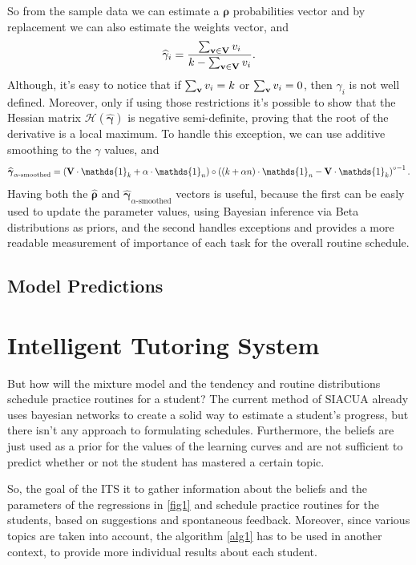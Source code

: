 \documentclass{article}
\newcommand{\0}{\mathbbold{0}}
\newcommand{\1}{\mathds{1}}
\newcommand{\2}{\mathbbold{2}}
\begin{document}
So from the sample data we can estimate a ${\boldsymbol \rho}$ probabilities vector and by replacement we can also estimate the weights vector, and
\begin{equation*}
    \widehat{\gamma}_i = \frac{\sum_{{\bf v}\in{\bf V}}v_i}{k - \sum_{{\bf v}\in{\bf V}}v_i}.
\end{equation*}
Although, it's easy to notice that if $\sum_{{\bf v}}v_i = k$ or $\sum_{{\bf v}}v_i = 0$, then $\gamma_i$ is not well defined. Moreover, only if using those restrictions it's possible to show that the Hessian matrix $\mathcal{H}(\widehat{\boldsymbol \gamma})$ is negative semi-definite, proving that the root of the derivative is a local maximum.
To handle this exception, we can use additive smoothing to the $\gamma$ values, and
\begin{equation*}
    \widehat{\boldsymbol \gamma}_{\alpha\text{-smoothed}} = \left({\bf V}\cdot\1_k + \alpha\cdot\1_n\right) \circ \left((k + \alpha n)\cdot\1_n - {\bf V}\cdot\1_k\right)^{\circ -1}.
\end{equation*}
Having both the $\widehat{\boldsymbol \rho}$ and $\widehat{\boldsymbol \gamma}_{\alpha\text{-smoothed}}$ vectors is useful, because the first can be easly used to update the parameter values, using Bayesian inference via Beta distributions as priors, and the second handles exceptions and provides a more readable measurement of importance of each task for the overall routine schedule.

\subsection{Model Predictions}


\section{Intelligent Tutoring System}
But how will the mixture model and the tendency and routine distributions schedule practice routines for a student? The current method of SIACUA already uses bayesian networks to create a solid way to estimate a student's progress, but there isn't any approach to formulating schedules.
Furthermore, the beliefs are just used as a prior for the values of the learning curves and are not sufficient to predict whether or not the student has mastered a certain topic.

So, the goal of the ITS it to gather information about the beliefs and the parameters of the regressions in \eqref{fig1} and schedule practice routines for the students, based on suggestions and spontaneous feedback. Moreover, since various topics are taken into account, the algorithm \eqref{alg1} has to be used in another context, to provide more individual results about each student.
\end{document}
